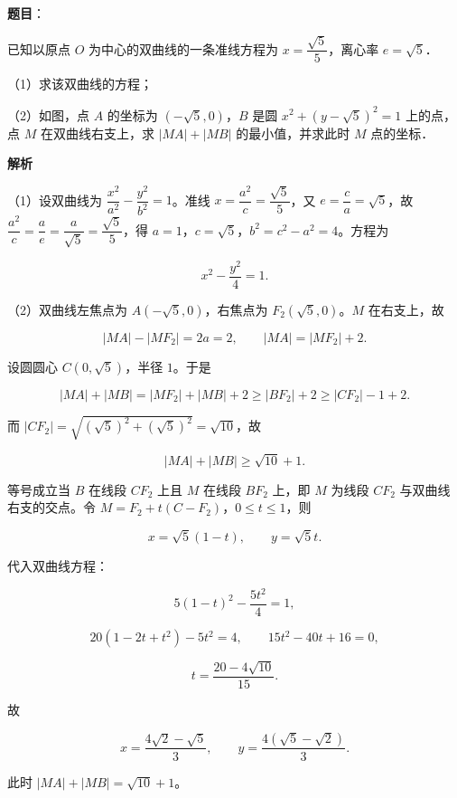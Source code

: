 \begin{answer}

\textbf{题目}：

已知以原点 $O$ 为中心的双曲线的一条准线方程为 $x=\dfrac{\sqrt5}5$，离心率 $e=\sqrt5$．

（1）求该双曲线的方程；

（2）如图，点 $A$ 的坐标为 $(-\sqrt5,0)$，$B$ 是圆 $x^2+(y-\sqrt5)^2=1$ 上的点，点 $M$ 在双曲线右支上，求 $|MA|+|MB|$ 的最小值，并求此时 $M$ 点的坐标．
\nopagebreak[4]
\begin{center}\end{center}
\nopagebreak[4]
\textbf{解析}

（1）设双曲线为 $\dfrac{x^2}{a^2}-\dfrac{y^2}{b^2}=1$。准线 $x=\dfrac{a^2}c=\dfrac{\sqrt5}5$，又 $e=\dfrac ca=\sqrt5$，故 $\dfrac{a^2}c=\dfrac ae=\dfrac a{\sqrt5}=\dfrac{\sqrt5}5$，得 $a=1$，$c=\sqrt5$，$b^2=c^2-a^2=4$。方程为

\nopagebreak[4]
\[x^2-\frac{y^2}4=1.\]

（2）双曲线左焦点为 $A(-\sqrt5,0)$，右焦点为 $F_2(\sqrt5,0)$。$M$ 在右支上，故

\nopagebreak[4]
\[|MA|-|MF_2|=2a=2,\qquad |MA|=|MF_2|+2.\]

设圆圆心 $C(0,\sqrt5)$，半径 $1$。于是

\nopagebreak[4]
\[|MA|+|MB|=|MF_2|+|MB|+2\geqslant|BF_2|+2\geqslant|CF_2|-1+2.\]

而 $|CF_2|=\sqrt{(\sqrt5)^2+(\sqrt5)^2}=\sqrt{10}$，故

\nopagebreak[4]
\[|MA|+|MB|\geqslant\sqrt{10}+1.\]

等号成立当 $B$ 在线段 $CF_2$ 上且 $M$ 在线段 $BF_2$ 上，即 $M$ 为线段 $CF_2$ 与双曲线右支的交点。令 $M=F_2+t(C-F_2)$，$0\leqslant t\leqslant1$，则

\nopagebreak[4]
\[x=\sqrt5(1-t),\qquad y=\sqrt5t.\]

代入双曲线方程：

\nopagebreak[4]
\[5(1-t)^2-\frac{5t^2}4=1,\]

\nopagebreak[4]
\[20(1-2t+t^2)-5t^2=4,\qquad 15t^2-40t+16=0,\]

\nopagebreak[4]
\[t=\frac{20-4\sqrt{10}}{15}.\]

故

\nopagebreak[4]
\[x=\frac{4\sqrt2-\sqrt5}3,\qquad y=\frac{4(\sqrt5-\sqrt2)}3.\]

此时 $|MA|+|MB|=\sqrt{10}+1$。


\end{answer}
